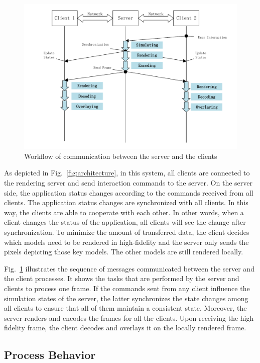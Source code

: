 \begin{figure}[!htbp]
	\includegraphics[width=\textwidth]{figures/sequence_workflow.pdf}
	\caption{Workflow of communication between the server and the clients}
	\label{fig:swf}
\end{figure}

As depicted in Fig.~\ref{fig:architecture}, in this system, all clients are connected to the rendering server and send interaction commands to the server.
On the server side, the application status changes according to the commands received from all clients. The application status changes are synchronized with all clients. In this way, the clients are able to cooperate with each other. In other words, when a client changes the status of the application, all clients will see the change after synchronization.
To minimize the amount of transferred data, the client decides which models need to be rendered in high-fidelity and the server only sends the pixels depicting those key models. The other models are still rendered locally.

Fig.~\ref{fig:swf} illustrates the sequence of messages communicated between the server and the client processes. It shows the tasks that are performed by the server and clients to process one frame. If the commands sent from any client influence the simulation states of the server, the latter synchronizes the state changes among all clients to ensure that all of them maintain a consistent state. Moreover, the server renders and encodes the frames for all the clients. Upon receiving the high-fidelity frame, the client decodes and overlays it on the locally rendered frame.

\subsection{Process Behavior}

